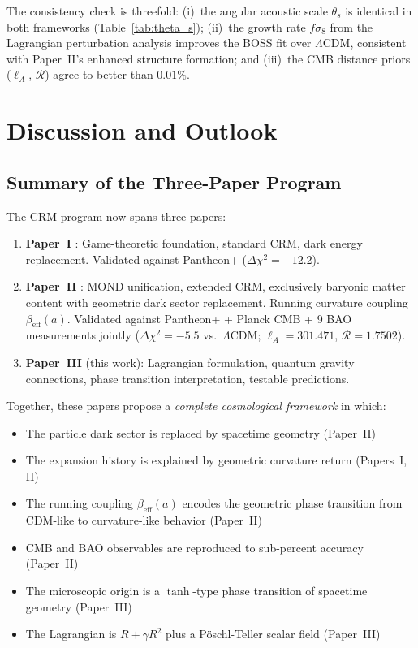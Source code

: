 \documentclass[aps,prd,twocolumn,superscriptaddress,nofootinbib]{revtex4-2}
\begin{document}
The consistency check is threefold: (i)~the angular acoustic scale $\theta_s$ is identical in both frameworks (Table~\ref{tab:theta_s}); (ii)~the growth rate $f\sigma_8$ from the Lagrangian perturbation analysis improves the BOSS fit over $\Lambda$CDM, consistent with Paper~II's enhanced structure formation; and (iii)~the CMB distance priors ($\ell_A$, $\mathcal{R}$) agree to better than $0.01\%$.


\section{Discussion and Outlook}
\label{sec:discussion}

\subsection{Summary of the Three-Paper Program}

The CRM program now spans three papers:
\begin{enumerate}
\item \textbf{Paper~I} \cite{Geiger2026}: Game-theoretic foundation, standard CRM, dark energy replacement. Validated against Pantheon+ ($\Delta\chi^2 = -12.2$).
\item \textbf{Paper~II} \cite{Geiger2026b}: MOND unification, extended CRM, exclusively baryonic matter content with geometric dark sector replacement. Running curvature coupling $\beta_{\mathrm{eff}}(a)$. Validated against Pantheon+ + Planck CMB + 9 BAO measurements jointly ($\Delta\chi^2 = -5.5$ vs.\ $\Lambda$CDM; $\ell_A = 301.471$, $\mathcal{R} = 1.7502$).
\item \textbf{Paper~III} (this work): Lagrangian formulation, quantum gravity connections, phase transition interpretation, testable predictions.
\end{enumerate}

Together, these papers propose a \textit{complete cosmological framework} in which:
\begin{itemize}
\item The particle dark sector is replaced by spacetime geometry (Paper~II)
\item The expansion history is explained by geometric curvature return (Papers~I, II)
\item The running coupling $\beta_{\mathrm{eff}}(a)$ encodes the geometric phase transition from CDM-like to curvature-like behavior (Paper~II)
\item CMB and BAO observables are reproduced to sub-percent accuracy (Paper~II)
\item The microscopic origin is a $\tanh$-type phase transition of spacetime geometry (Paper~III)
\item The Lagrangian is $R + \gamma R^2$ plus a P\"oschl-Teller scalar field (Paper~III)
\end{itemize}
\end{document}
